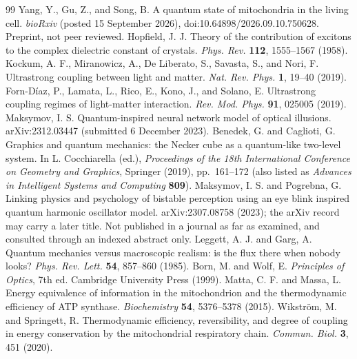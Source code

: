 \documentclass[11pt]{article}
\theoremstyle{plain}
\theoremstyle{definition}
\theoremstyle{remark}
\begin{document}
\begin{thebibliography}{99}
 Yang, Y., Gu, Z., and Song, B. A quantum state of mitochondria in the living cell. \emph{bioRxiv} (posted 15 September 2026), doi:10.64898/2026.09.10.750628. Preprint, not peer reviewed.
 Hopfield, J. J. Theory of the contribution of excitons to the complex dielectric constant of crystals. \emph{Phys. Rev.} \textbf{112}, 1555--1567 (1958).
 Kockum, A. F., Miranowicz, A., De Liberato, S., Savasta, S., and Nori, F. Ultrastrong coupling between light and matter. \emph{Nat. Rev. Phys.} \textbf{1}, 19--40 (2019).
 Forn-D\'iaz, P., Lamata, L., Rico, E., Kono, J., and Solano, E. Ultrastrong coupling regimes of light-matter interaction. \emph{Rev. Mod. Phys.} \textbf{91}, 025005 (2019).
 Maksymov, I. S. Quantum-inspired neural network model of optical illusions. arXiv:2312.03447 (submitted 6 December 2023).
 Benedek, G. and Caglioti, G. Graphics and quantum mechanics: the Necker cube as a quantum-like two-level system. In L. Cocchiarella (ed.), \emph{Proceedings of the 18th International Conference on Geometry and Graphics}, Springer (2019), pp.~161--172 (also listed as \emph{Advances in Intelligent Systems and Computing} \textbf{809}).
 Maksymov, I. S. and Pogrebna, G. Linking physics and psychology of bistable perception using an eye blink inspired quantum harmonic oscillator model. arXiv:2307.08758 (2023); the arXiv record may carry a later title. Not published in a journal as far as examined, and consulted through an indexed abstract only.
 Leggett, A. J. and Garg, A. Quantum mechanics versus macroscopic realism: is the flux there when nobody looks? \emph{Phys. Rev. Lett.} \textbf{54}, 857--860 (1985).
 Born, M. and Wolf, E. \emph{Principles of Optics}, 7th ed. Cambridge University Press (1999).
 Matta, C. F. and Massa, L. Energy equivalence of information in the mitochondrion and the thermodynamic efficiency of ATP synthase. \emph{Biochemistry} \textbf{54}, 5376--5378 (2015).
 Wikstr\"om, M. and Springett, R. Thermodynamic efficiency, reversibility, and degree of coupling in energy conservation by the mitochondrial respiratory chain. \emph{Commun. Biol.} \textbf{3}, 451 (2020).
\end{thebibliography}
\end{document}
